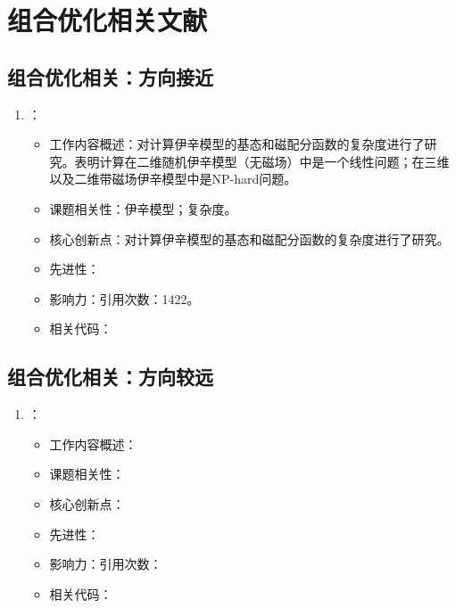 \chapter{组合优化相关文献}
\section{组合优化相关：方向接近}
    \begin{enumerate}
        \item \citet{barahona1982computational}：
        \begin{itemize}
            \item 工作内容概述：对计算伊辛模型的基态和磁配分函数的复杂度进行了研究。表明计算在二维随机伊辛模型（无磁场）中是一个线性问题；在三维以及二维带磁场伊辛模型中是NP-hard问题。
            \item 课题相关性：伊辛模型；复杂度。
            \item 核心创新点：对计算伊辛模型的基态和磁配分函数的复杂度进行了研究。
            \item 先进性：
            \item 影响力：引用次数：1422。
            \item 相关代码：
        \end{itemize}
    \end{enumerate}
\section{组合优化相关：方向较远}
\begin{enumerate}
    \item \citet{}：
        \begin{itemize}
            \item 工作内容概述：
            \item 课题相关性：
            \item 核心创新点：
            \item 先进性：
            \item 影响力：引用次数：
            \item 相关代码：
        \end{itemize}

\end{enumerate}